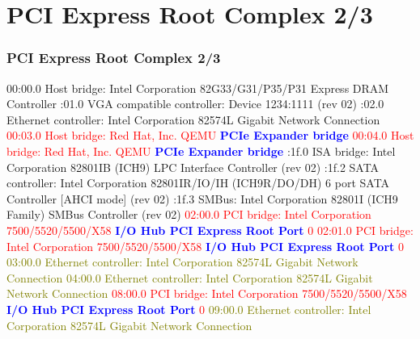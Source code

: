 \documentclass[aspectratio=169]{beamer}
\begin{document}
\section{PCI Express Root Complex 2/3}
\begin{frame}
\frametitle{PCI Express Root Complex 2/3}
\begin{block}{}
\small
00:00.0 Host bridge: Intel Corporation 82G33/G31/P35/P31 Express DRAM Controller :01.0 VGA compatible controller: Device 1234:1111 (rev 02) :02.0 Ethernet controller: Intel Corporation 82574L Gigabit Network Connection \newline
\textcolor{red}{00:03.0 Host bridge: Red Hat, Inc. QEMU \textbf{\textcolor{blue}{PCIe Expander bridge}}} \newline
\textcolor{red}{00:04.0 Host bridge: Red Hat, Inc. QEMU \textbf{\textcolor{blue}{PCIe Expander bridge}}} :1f.0 ISA bridge: Intel Corporation 82801IB (ICH9) LPC Interface Controller (rev 02) :1f.2 SATA controller: Intel Corporation 82801IR/IO/IH (ICH9R/DO/DH) 6 port SATA Controller [AHCI mode] (rev 02) :1f.3 SMBus: Intel Corporation 82801I (ICH9 Family) SMBus Controller (rev 02) \newline
\textcolor{red}{02:00.0 PCI bridge: Intel Corporation 7500/5520/5500/X58 \textbf{\textcolor{blue}{I/O Hub PCI Express Root Port}} 0}  \newline
\textcolor{red}{02:01.0 PCI bridge: Intel Corporation 7500/5520/5500/X58 \textbf{\textcolor{blue}{I/O Hub PCI Express Root Port}} 0}  \newline
\textcolor{olive}{03:00.0 Ethernet controller: Intel Corporation 82574L Gigabit Network Connection} \newline
\textcolor{olive}{04:00.0 Ethernet controller: Intel Corporation 82574L Gigabit Network Connection} \newline
\textcolor{red}{08:00.0 PCI bridge: Intel Corporation 7500/5520/5500/X58 \textbf{\textcolor{blue}{I/O Hub PCI Express Root Port}} 0}  \newline
\textcolor{olive}{09:00.0 Ethernet controller: Intel Corporation 82574L Gigabit Network Connection}
\end{block}
\end{frame}

\end{document}
